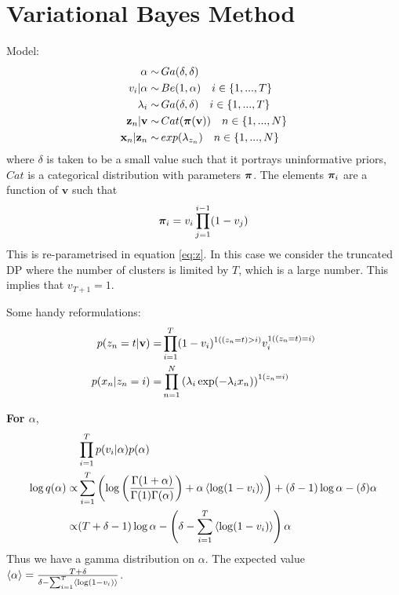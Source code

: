 \documentclass{article}
\begin{document}
\section{Variational Bayes Method}
Model:
\begin{align}
\alpha \sim & \, Ga(\delta,\delta)
\label{eq:alpha}\\
v_i|\alpha \sim & \, Be(1,\alpha)\quad i\in\{1,...,T\}
\label{eq:v}\\
\lambda_i\sim & \, Ga(\delta,\delta)\quad i\in\{1,...,T\}\\
\mathbf{z}_n|\mathbf{v}\sim & \, Cat(\bm{\pi}(\mathbf{v})) \quad n\in\{1,...,N\} \\
\mathbf{x}_n|\mathbf{z}_n\sim & \, exp(\lambda_{z_n}) \quad n\in\{1,...,N\}
\label{eq:gen}
\end{align}
where $\delta$ is taken to be a small value such that it portrays uninformative priors, $Cat$ is a categorical distribution with parameters $\bm{\pi}$. The elements $\bm{\pi}_i$ are a function of $\mathbf{v}$ such that 
\begin{align}
\bm{\pi}_i=v_i\prod_{j=1}^{i-1}(1-v_j)
\end{align}
This is re-parametrised in equation \ref{eq:z}.  In this case we consider the truncated DP where the number of clusters is limited by $T$, which is a large number. This implies that $v_{T+1}=1$.

Some handy reformulations:
\begin{align}
p(z_n=t|\mathbf{v})=& \prod_{i=1}^{T}(1-v_i)^{1((z_n=t)>i)}v_i^{1((z_n=t)=i)}\label{eq:z}\\
p(x_n|z_n=i)= &\prod_{n=1}^{N} \left(\lambda_i\exp(-\lambda_i x_n)\right)^{1(z_n=i)}
\end{align}

\textbf{For $\alpha$},
\begin{align}
\nonumber&\prod_{i=1}^{T}p(v_i|\alpha)p(\alpha)\\
\nonumber\log q(\alpha)\propto &  \sum_{i=1}^{T}\left( \log\left(\frac{\Gamma(1+\alpha)}{\Gamma(1)\Gamma(\alpha)}\right)+\alpha\left\langle\log (1-v_i)\right\rangle\right)+(\delta-1)\log \alpha -(\delta)\alpha\\
\propto & (T+\delta-1)\log \alpha-\left(\delta-\sum_{i=1}^{T} \left\langle\log (1-v_i)\right\rangle\right) \alpha
\end{align}
Thus we have a gamma distribution on $\alpha$. The expected value $\left\langle\alpha\right\rangle=\frac{T+\delta}{\delta-\sum_{i=1}^{T} \left\langle\log (1-v_i)\right\rangle}$.
\end{document}
